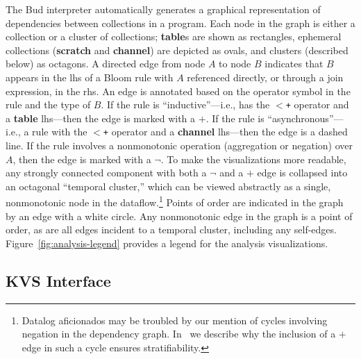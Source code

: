 The Bud interpreter automatically generates a graphical
representation of dependencies between collections in a program.
Each node in the graph is either a collection or a cluster of collections; \textbf{table}s are shown as rectangles, ephemeral
collections (\textbf{scratch} and \textbf{channel}) are depicted as ovals, and clusters (described below) as octagons.  A
directed edge from node $A$ to node $B$ indicates that $B$ appears in the
lhs of a Bloom rule with $A$ referenced directly, or through a join expression,
in the rhs.  An edge is annotated based on the operator symbol in the rule and
the type of $B$.  If the rule is ``inductive''---i.e., has the \texttt{$<$+}
operator and a {\bf table} lhs---then the edge is marked with a $+$.  If the
rule is ``asynchronous''---i.e., a rule with the \texttt{$<$+} operator and a {\bf
channel} lhs---then the edge is a dashed line.  If the rule involves
a nonmonotonic operation (aggregation or negation) over $A$, then the edge is marked with a $\lnot$.
To make the visualizations more readable, any strongly connected component with both a $\lnot$ and a $+$ edge is collapsed into an octagonal ``temporal cluster,'' 
which can be viewed abstractly as a single, nonmonotonic node in the 
dataflow.\footnote{Datalog aficionados may be troubled by our mention of cycles
involving negation in the dependency graph.  In~\cite{dedalus} we
describe why the inclusion of a $+$ edge in such a cycle ensures stratifiability.}
Points of order are indicated in the graph by an edge with a white circle.
 Any nonmonotonic edge in the graph is a point of order, as are all edges incident to a temporal cluster, including any self-edges.  Figure~\ref{fig:analysis-legend} provides a legend for the analysis visualizations.



\subsection{KVS Interface}


